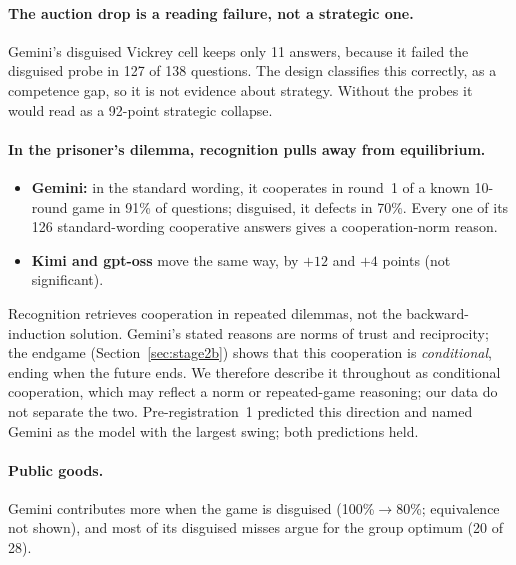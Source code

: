 \documentclass[11pt]{article}
\theoremstyle{definition}
\theoremstyle{remark}
\begin{document}
\paragraph{The auction drop is a reading failure, not a strategic one.} Gemini's disguised
Vickrey cell keeps only 11 answers, because it failed the disguised probe in 127 of 138
questions. The design classifies this correctly, as a competence gap, so it is not evidence
about strategy. Without the probes it would read as a 92-point strategic collapse.

\paragraph{In the prisoner's dilemma, recognition pulls away from equilibrium.}
\begin{itemize}
\item \textbf{Gemini:} in the standard wording, it cooperates in round~1 of a known 10-round game in
  91\% of questions; disguised, it defects in 70\%. Every one of its 126 standard-wording
  cooperative answers gives a cooperation-norm reason.
\item \textbf{Kimi and gpt-oss} move the same way, by $+12$ and $+4$ points (not significant).
\end{itemize}
Recognition retrieves cooperation in repeated dilemmas, not the backward-induction solution.
Gemini's stated reasons are norms of trust and reciprocity; the endgame
(Section~\ref{sec:stage2b}) shows that this cooperation is \emph{conditional}, ending when the
future ends. We therefore describe it throughout as conditional cooperation, which may reflect a
norm or repeated-game reasoning; our data do not separate the two. Pre-registration~1 predicted this direction and named Gemini as the
model with the largest swing; both predictions held.

\paragraph{Public goods.} Gemini contributes more when the game is disguised (100\%$\to$80\%;
equivalence not shown), and most of its disguised misses argue for the group optimum (20 of 28).
\end{document}
